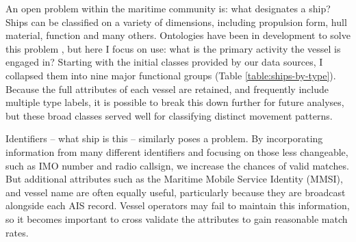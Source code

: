 \documentclass[12pt,letterpaper]{article}
\begin{document}





An open problem within the maritime community is: what designates a ship? Ships can be classified on a variety of dimensions, including propulsion form, hull material, function and many others. Ontologies have been in development to solve this problem \cite{Vries2009}, but here I focus on use: what is the primary activity the vessel is engaged in? Starting with the initial classes provided by our data sources, I collapsed them into nine major functional groups (Table \ref{table:ships-by-type}). Because the full attributes of each vessel are retained, and frequently include multiple type labels, it is possible to break this down further for future analyses, but these broad classes served well for classifying distinct movement patterns.

Identifiers -- what ship is this -- similarly poses a problem. By incorporating information from many different identifiers and focusing on those less changeable, such as IMO number and radio callsign, we increase the chances of valid matches. But additional attributes such as the Maritime Mobile Service Identity (MMSI), and vessel name are often equally useful, particularly because they are broadcast alongside each AIS record. Vessel operators may fail to maintain this information, so it becomes important to cross validate the attributes to gain reasonable match rates.
\end{document}
